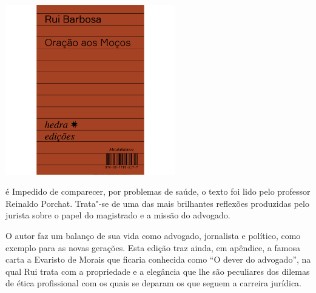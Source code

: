 \pagebreak

\begin{center}
\hspace*{-3.6cm}
\hspace*{3.1cm}\includegraphics[width=74mm]{./grid/barbosa.jpg}
\end{center}

\hspace*{-7cm}\hrulefill\hspace*{-7cm}

\medskip

 é  Impedido de comparecer,  por problemas de saúde, o texto foi
lido pelo professor Reinaldo Porchat. Trata"-se de uma das mais
brilhantes reflexões produzidas pelo jurista sobre o papel do
magistrado e a missão do advogado.

O autor faz um balanço de sua vida
como advogado, jornalista e político, como exemplo para as novas
gerações. Esta edição traz ainda, em apêndice, a famosa carta
a Evaristo de Morais que ficaria conhecida como ``O dever do advogado'',
na qual Rui trata com a propriedade e a elegância que lhe são peculiares
dos dilemas de ética profissional com os quais se deparam os que 
seguem a carreira jurídica. 

\vfill

\hspace*{-.4cm}\begin{minipage}[c]{.5\linewidth}
\small{
{}}
\end{minipage}

